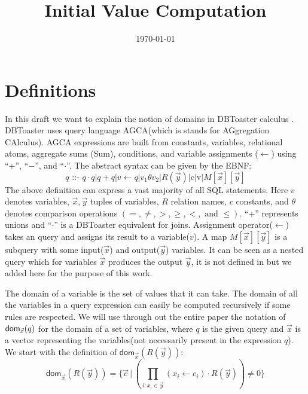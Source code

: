 \documentclass[12pt]{article}
\begin{document}
\title{Initial Value Computation}
\author{}
\date{\today}
\maketitle
\newcommand{\dom}{\textsf{dom}}

\section{Definitions}
In this draft we want to explain the notion of domains in DBToaster calculus \cite{1}. DBToaster uses query language AGCA(which is stands for AGgregation CAlculus). 
AGCA expressions are built from constants, variables, relational atoms, aggregate sums (Sum), conditions, and variable assignments ($\gets$) using ``+'', ``−'', and ``$\cdot$''. The abstract syntax can be given by the EBNF:
\begin{equation}
\label{def:agca}
q\text{ ::- }q\cdot q | q + q|v \gets q |v_{1}\theta v_{2}|R(\vec{y})|\text{c}|\text{v}|M[\vec{x}][\vec{y}]
\end{equation}
The above definition can express a vast majority of all SQL statements. Here $v$ denotes variables, $\vec{x},\vec{y}$ tuples of variables, $R$ relation names, $c$ constants, and $\theta$ denotes comparison operations $(=,\neq, >, \geq, <, \text{ and }\leq)$.
 ``+'' represents unions and ``$\cdot$'' is a DBToaster equivalent for joins. Assignment operator($\gets$) takes an query and assigns its result to a variable($v$). A map $M[\vec{x}][\vec{y}]$ is a subquery with some input($\vec{x}$) and output($\vec{y}$) variables. It can be seen as a nested query which for variables $\vec{x}$ produces the output $\vec{y}$, it is not defined in \cite{1} but we added here for the purpose of this work.

The domain of a variable is the set of values that it can take. The domain of all the variables in a query expression can easily be computed recursively if some rules are respected. We will use through out the entire paper the notation of $\text{\dom{}}_{\vec x}(q)$ for the domain of a set of variables, where $q$ is the given query and $\vec x$ is a vector representing the variables(not necessarily present in the expression $q$).  We start with the definition of $\dom{}_{\vec x}(R(\vec y))$:
\begin{equation}
\label{def:relation}
\dom{}_{\vec x}(R(\vec y))=\bigg\{\vec c\,\Big|\,(\prod_{i:x_{i}\in \vec y}^{}(x_{i}\gets c_{i})\cdot R(\vec y))\not= 0\bigg\}
\end{equation}
\end{document}
